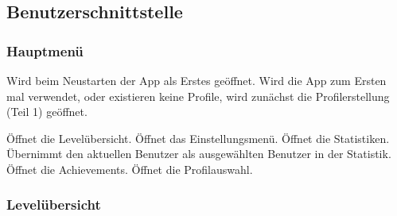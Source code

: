 \subsection{Benutzerschnittstelle}

\subsubsection{Hauptmenü}

\begin{center}
\setlength\fboxsep{20pt}
\setlength\fboxrule{1pt}
\end{center}

Wird beim Neustarten der App als Erstes geöffnet. Wird die App zum Ersten mal verwendet, oder existieren keine Profile, wird zunächst die Profilerstellung (Teil 1) geöffnet.
\begin{requirements}
 Öffnet die Levelübersicht.
 Öffnet das Einstellungsmenü.
 Öffnet die Statistiken. Übernimmt den aktuellen Benutzer als ausgewählten Benutzer in der Statistik.
 Öffnet die Achievements.
 Öffnet die Profilauswahl.
\end{requirements}

\subsubsection{Levelübersicht}

